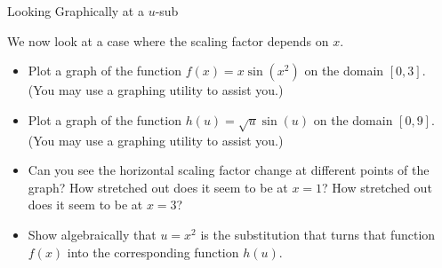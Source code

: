 \begin{exercise}{Looking Graphically at a $u$-sub \Coffeecup \Coffeecup}

We now look at a case where the scaling factor depends on $x$.
\begin{itemize}
\item Plot a graph of the function $f(x)=x\sin(x^2)$ on the domain $[0,3]$. (You may use a graphing utility to assist you.)
\end{itemize}
\begin{minipage}[l]{.75\textwidth}
\begin{itemize}
\item  Plot a graph of the function $h(u)=\sqrt{u}\sin(u)$ on the domain $[0,9]$. (You may use a graphing utility to assist you.)

\item Can you see the horizontal scaling factor change at different points of the graph?  How stretched out does it seem to be at $x=1$?  How stretched out does it seem to be at $x=3$?

\item Show algebraically that $u=x^2$ is the substitution that turns that function $f(x)$ into the corresponding function $h(u)$.


\end{itemize}
\end{minipage}
\end{exercise}
